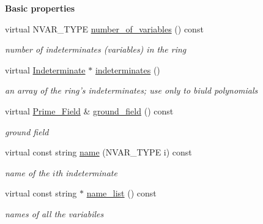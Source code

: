 \begin{Indent}\textbf{ Basic properties}\par
\begin{DoxyCompactItemize}
\item 
\mbox{\label{group__polygroup_a79e7dd821659e9d4b6862487963f7352}} 
virtual N\+V\+A\+R\+\_\+\+T\+Y\+PE \hyperlink{group__polygroup_a79e7dd821659e9d4b6862487963f7352}{number\+\_\+of\+\_\+variables} () const
\begin{DoxyCompactList}\small\item\em number of indeterminates (variables) in the ring \end{DoxyCompactList}\item 
\mbox{\label{group__polygroup_afea6c3a4fd9f3f04f312579a94a3cc1b}} 
virtual \hyperlink{group__polygroup_class_indeterminate}{Indeterminate} $\ast$ \hyperlink{group__polygroup_afea6c3a4fd9f3f04f312579a94a3cc1b}{indeterminates} ()
\begin{DoxyCompactList}\small\item\em an array of the ring's indeterminates; use only to biuld polynomials \end{DoxyCompactList}\item 
\mbox{\label{group__polygroup_a643bd55dbe8686b2dd1341503a67aace}} 
virtual \hyperlink{group___fields_group_class_prime___field}{Prime\+\_\+\+Field} \& \hyperlink{group__polygroup_a643bd55dbe8686b2dd1341503a67aace}{ground\+\_\+field} () const
\begin{DoxyCompactList}\small\item\em ground field \end{DoxyCompactList}\item 
\mbox{\label{group__polygroup_a657caa3e9c277ca34d20cb69eed7fe05}} 
virtual const string \hyperlink{group__polygroup_a657caa3e9c277ca34d20cb69eed7fe05}{name} (N\+V\+A\+R\+\_\+\+T\+Y\+PE i) const
\begin{DoxyCompactList}\small\item\em name of the $i$th indeterminate \end{DoxyCompactList}\item 
\mbox{\label{group__polygroup_aef9c6745956393863080422ddb8da48c}} 
virtual const string $\ast$ \hyperlink{group__polygroup_aef9c6745956393863080422ddb8da48c}{name\+\_\+list} () const
\begin{DoxyCompactList}\small\item\em names of all the variabiles \end{DoxyCompactList}\end{DoxyCompactItemize}
\end{Indent}

